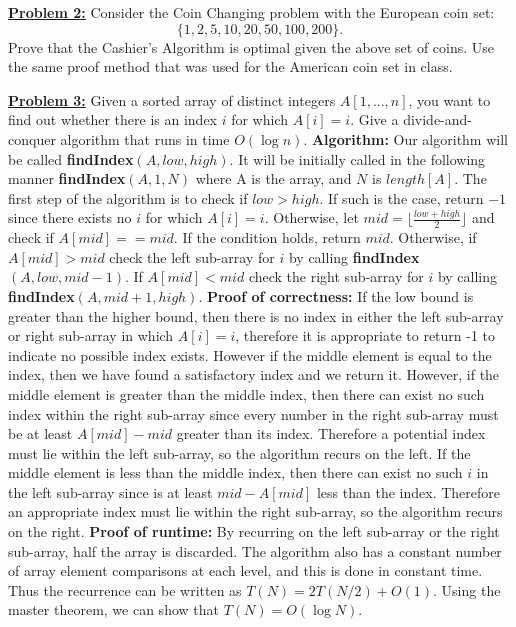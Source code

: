 \documentclass[11pt]{article}
\begin{document}
\begin{flushleft}
	\newpage
	\item \textbf {\underline{Problem 2:}} Consider the Coin Changing problem with the European coin set:
	\begin{displaymath}
	\{ 1, 2, 5, 10, 20, 50, 100, 200 \}.
	\end{displaymath}
	Prove that the Cashier's Algorithm is optimal given the above set of coins.
	Use the same proof method that was used for the American coin set in class.
	\newpage
	\item \textbf {\underline{Problem 3:}} Given a sorted array of distinct integers $A[1, . . . , n]$, you want to
	find out whether there is an index $i$ for which $A[i] = i$. Give a
	divide-and-conquer algorithm that runs in time $O(\log n).$
	\newline
	\newline
	\textbf{Algorithm:} Our algorithm will be called \textbf{findIndex}$(A, low, high)$. It will be initially called in the following manner \textbf{findIndex}$(A, 1, N)$ where A is the array, and $N$ is $length[A]$. The first step of the algorithm is to check if $low > high$. If such is the case, return $-1$ since there exists no $i$ for which $A[i] = i$. Otherwise, let $mid = \lfloor \frac{low + high}{2} \rfloor$ and check if $A[mid] == mid$. If the condition holds, return $mid$. Otherwise, if $A[mid] > mid$ check the left sub-array for $i$ by calling \textbf{findIndex}$(A, low, mid - 1)$. If $A[mid] < mid$ check the right sub-array for $i$ by calling \textbf{findIndex}$(A, mid + 1, high)$. 
	\newline
	\newline
	\textbf{Proof of correctness:} If the low bound is greater than the higher bound, then there is no index in either the left sub-array or right sub-array in which $A[i] = i$, therefore it is appropriate to return -1 to indicate no possible index exists. However if the middle element is equal to the index, then we have found a satisfactory index and we return it. However, if the middle element is greater than the middle index, then there can exist no such index within the right sub-array since every number in the right sub-array must be at least $A[mid] - mid$ greater than its index. Therefore a potential index must lie within the left sub-array, so the algorithm recurs on the left. If the middle element is less than the middle index, then there can exist no such $i$ in the left sub-array since is at least $mid - A[mid]$ less than the index. Therefore an appropriate index must lie within the right sub-array, so the algorithm recurs on the right. 
	\newline
	\newline
	\textbf{Proof of runtime: }By recurring on the left sub-array or the right sub-array, half the array is discarded. The algorithm also has a constant number of array element comparisons at each level, and this is done in constant time. Thus the recurrence can be written as $T(N) = 2T(N / 2) + O(1)$. Using the master theorem, we can show that $T(N) = O(\log N)$.
	
	
\end{flushleft}
\end{document}
